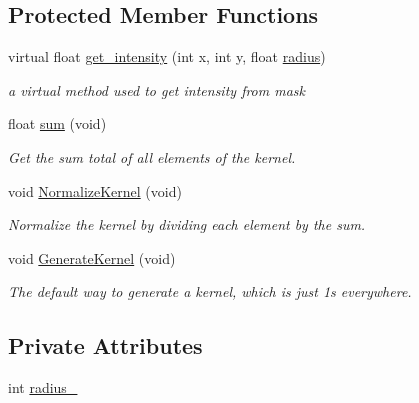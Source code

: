 \subsection*{Protected Member Functions}
\begin{DoxyCompactItemize}
\item 
virtual float \hyperlink{classimage__tools_1_1Kernel_a214a76e32ad4bedf68045f8df423689a}{get\+\_\+intensity} (int x, int y, float \hyperlink{classimage__tools_1_1Kernel_ac834d16a242dd4a15f5f5e4a6dacea01}{radius})
\begin{DoxyCompactList}\small\item\em a virtual method used to get intensity from mask \end{DoxyCompactList}\item 
float \hyperlink{classimage__tools_1_1Kernel_af2c442a9969338d4ede4572526353833}{sum} (void)\hypertarget{classimage__tools_1_1Kernel_af2c442a9969338d4ede4572526353833}{}\label{classimage__tools_1_1Kernel_af2c442a9969338d4ede4572526353833}

\begin{DoxyCompactList}\small\item\em Get the sum total of all elements of the kernel. \end{DoxyCompactList}\item 
void \hyperlink{classimage__tools_1_1Kernel_aac797e48d4e2880752fe805455e68216}{Normalize\+Kernel} (void)\hypertarget{classimage__tools_1_1Kernel_aac797e48d4e2880752fe805455e68216}{}\label{classimage__tools_1_1Kernel_aac797e48d4e2880752fe805455e68216}

\begin{DoxyCompactList}\small\item\em Normalize the kernel by dividing each element by the sum. \end{DoxyCompactList}\item 
void \hyperlink{classimage__tools_1_1Kernel_ad8e455573607e492d945eb37432926fd}{Generate\+Kernel} (void)\hypertarget{classimage__tools_1_1Kernel_ad8e455573607e492d945eb37432926fd}{}\label{classimage__tools_1_1Kernel_ad8e455573607e492d945eb37432926fd}

\begin{DoxyCompactList}\small\item\em The default way to generate a kernel, which is just 1\textquotesingle{}s everywhere. \end{DoxyCompactList}\end{DoxyCompactItemize}
\subsection*{Private Attributes}
\begin{DoxyCompactItemize}
\item 
int \hyperlink{classimage__tools_1_1Kernel_a75493a8e73d0217897d83da1ad30cc82}{radius\+\_\+}
\end{DoxyCompactItemize}



